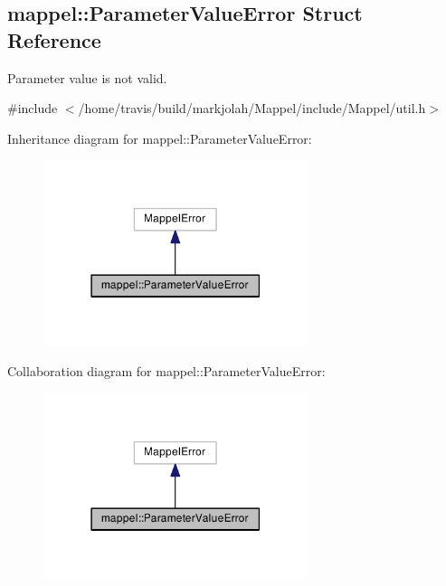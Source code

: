 \hypertarget{structmappel_1_1ParameterValueError}{}\subsection{mappel\+:\+:Parameter\+Value\+Error Struct Reference}
\label{structmappel_1_1ParameterValueError}


Parameter value is not valid.  




{\ttfamily \#include $<$/home/travis/build/markjolah/\+Mappel/include/\+Mappel/util.\+h$>$}



Inheritance diagram for mappel\+:\+:Parameter\+Value\+Error\+:\nopagebreak
\begin{figure}[H]
\begin{center}
\leavevmode
\includegraphics[width=219pt]{structmappel_1_1ParameterValueError__inherit__graph}
\end{center}
\end{figure}


Collaboration diagram for mappel\+:\+:Parameter\+Value\+Error\+:\nopagebreak
\begin{figure}[H]
\begin{center}
\leavevmode
\includegraphics[width=219pt]{structmappel_1_1ParameterValueError__coll__graph}
\end{center}
\end{figure}
